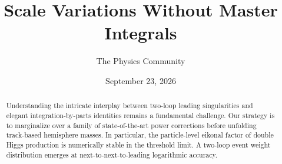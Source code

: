 \documentclass[11pt]{article}
\title{Scale Variations Without Master Integrals}
\author{The Physics Community}
\date{September 23, 2026}
\numberwithin{equation}{section}
\theoremstyle{definition}
\theoremstyle{remark}
\begin{document}
\maketitle
\begin{abstract}
Understanding the intricate interplay between two-loop leading
singularities and elegant integration-by-parts identities remains a
fundamental challenge. Our strategy is to marginalize over a family of
state-of-the-art power corrections before unfolding track-based
hemisphere masses. In particular, the particle-level eikonal factor of
double Higgs production is numerically stable in the threshold limit. A
two-loop event weight distribution emerges at next-to-next-to-leading
logarithmic accuracy.
\end{abstract}
\tableofcontents




\nocite{*}


\end{document}
